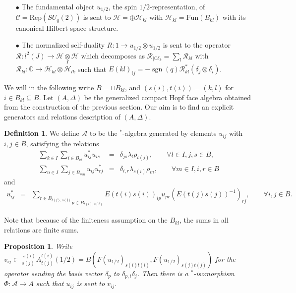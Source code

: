 \documentclass[12pt]{article}
\theoremstyle{change}
\DeclareMathOperator{\sgn}{\mathrm{sgn}}
\newcommand{\C}{\mathbb{C}}
\newcommand{\CatC}{\mathcal{C}}
\newcommand{\Gr}[5]{\;{}^{\;#2}_{#4}#1_{#5}^{#3}}%
\newcommand{\Fun}{\mathrm{Fun}}
\newcommand{\iitimes}{\underset{I}{\otimes}}
\newcommand{\Rep}{\mathrm{Rep}}
\newcommand{\DA}{\mathcal{A}}
\newtheorem{Prop}[Theorem]{Proposition}
\theoremstyle{definition}
\newtheorem{Def}[Theorem]{Definition}
\numberwithin{equation}{section}
\begin{document}
\begin{itemize}
 \item[$\bullet$] The fundamental object $u_{1/2}$, the spin $1/2$-representation, of $\CatC=\Rep(SU_q(2))$ is sent to $\mathscr{H} = \oplus \mathscr{H}_{kl}$ with $\mathscr{H}_{kl} = \Fun(B_{kl})$ with its canonical Hilbert space structure.
 \item[$\bullet$] The normalized self-duality $R: 1\rightarrow u_{1/2}\otimes u_{1/2}$ is sent to the operator $\mathscr{R}:l^2(J)\rightarrow \mathscr{H}\iitimes \mathscr{H}$ which decomposes as $\mathscr{R}_{\mid\C\delta_k} = \sum_l \mathscr{R}_{kl}$ with $\mathscr{R}_{kl}:\C\rightarrow \mathscr{H}_{kl}\otimes \mathscr{H}_{lk}$ such that $E(kl)_{ij} = -\sgn(q)\mathscr{R}_{kl}^*(\delta_j\otimes \delta_i)$.
\end{itemize}

We will in the following write $B=\sqcup B_{kl}$, and $(s(i),t(i))=(k,l)$ for $i\in B_{kl}\subseteq B$. Let $(A,\Delta)$ be the generalized compact Hopf face algebra obtained from the construction of the previous section. Our aim is to find an explicit generators and relations description of $(A,\Delta)$.

\begin{Def} We define $\DA$ to be the $^*$-algebra generated by elements $u_{ij}$ with $i,j\in B$, satisfying the relations \begin{eqnarray*} \sum_{k\in I}\sum_{i\in B_{kl}} u_{ij}^*u_{is} &=& \delta_{js} \lambda_{l}\rho_{t(j)},\qquad \forall l\in I,j,s\in B, \\ \sum_{n\in I}\sum_{j\in B_{mn}} u_{ij}u_{rj}^* &=& \delta_{i,r}\lambda_{s(i)}\rho_m,\qquad\forall m\in I,i,r\in B\end{eqnarray*} and \begin{eqnarray*} u_{ij}^* &=& \underset{p\in B_{t(i),s(i)}}{\underset{r\in B_{t(j),s(j)}}{\sum}} E(t(i)s(i))_{ip}u_{pr}(E(t(j)s(j))^{-1})_{rj},\qquad \forall i,j\in B.\end{eqnarray*}
\end{Def}

Note that because of the finiteness assumption on the $B_{kl}$, the sums in all relations are finite sums.

\begin{Prop} Write $v_{ij}\in \Gr{A}{s(i)}{t(i)}{s(j)}{t(j)}(1/2) = B(F(u_{1/2})_{s(i)t(i)},F(u_{1/2})_{s(j)t(j)})$ for the operator sending the basis vector $\delta_{p}$ to $\delta_{p,i} \delta_j$. Then there is a $^*$-isomorphism $\Phi:\DA\rightarrow A$ such that $u_{ij}$ is sent to $v_{ij}$.
\end{Prop}
\end{document}
